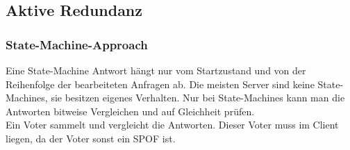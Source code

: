 \documentclass[a4paper]{article}
\begin{document}
\subsection{Aktive Redundanz}
\subsubsection{State-Machine-Approach}
Eine State-Machine Antwort hängt nur vom Startzustand und von der Reihenfolge der bearbeiteten Anfragen ab. Die meisten Server sind keine State-Machines, sie besitzen eigenes Verhalten. Nur bei State-Machines kann man die Antworten bitweise Vergleichen und auf Gleichheit prüfen.\\
Ein Voter sammelt und vergleicht die Antworten. Dieser Voter muss im Client liegen, da der Voter sonst ein SPOF ist.
\end{document}
